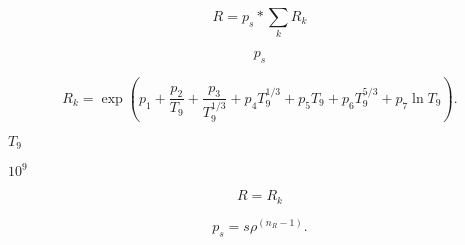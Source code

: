 \documentclass{article}
\begin{document}
\[ R = p_s*\sum_k R_k \]
\pagebreak

\[p_s\]
\pagebreak

\[ R_k = \exp(p_1 + \frac{p_2}{T_9} + \frac{p_3}{T_9^{1/3}} + p_{4}T_9^{1/3} + p_{5}T_9 + p_{6}T_9^{5/3} + p_{7}\ln T_9). \]
\pagebreak

$T_9$
\pagebreak

$10^9$
\pagebreak

\[R = R_k\]
\pagebreak

\[ p_s = s\rho^{(n_R -1)}. \]
\pagebreak
\end{document}
